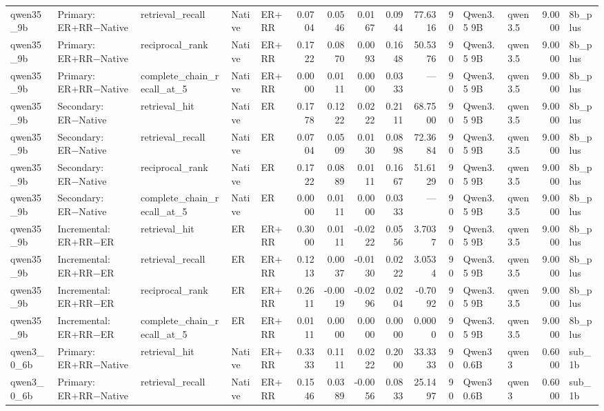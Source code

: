 \begin{tabular}{lllllrrrrrrllrl}
qwen35_9b & Primary: ER+RR−Native & retrieval_recall & Native & ER+RR & 0.0704 & 0.0546 & 0.0167 & 0.0944 & 77.6316 & 90 & Qwen3.5 9B & qwen3.5 & 9.0000 & 8b_plus \\
qwen35_9b & Primary: ER+RR−Native & reciprocal_rank & Native & ER+RR & 0.1722 & 0.0870 & 0.0093 & 0.1648 & 50.5376 & 90 & Qwen3.5 9B & qwen3.5 & 9.0000 & 8b_plus \\
qwen35_9b & Primary: ER+RR−Native & complete_chain_recall_at_5 & Native & ER+RR & 0.0000 & 0.0111 & 0.0000 & 0.0333 & — & 90 & Qwen3.5 9B & qwen3.5 & 9.0000 & 8b_plus \\
qwen35_9b & Secondary: ER−Native & retrieval_hit & Native & ER & 0.1778 & 0.1222 & 0.0222 & 0.2111 & 68.7500 & 90 & Qwen3.5 9B & qwen3.5 & 9.0000 & 8b_plus \\
qwen35_9b & Secondary: ER−Native & retrieval_recall & Native & ER & 0.0704 & 0.0509 & 0.0130 & 0.0898 & 72.3684 & 90 & Qwen3.5 9B & qwen3.5 & 9.0000 & 8b_plus \\
qwen35_9b & Secondary: ER−Native & reciprocal_rank & Native & ER & 0.1722 & 0.0889 & 0.0111 & 0.1667 & 51.6129 & 90 & Qwen3.5 9B & qwen3.5 & 9.0000 & 8b_plus \\
qwen35_9b & Secondary: ER−Native & complete_chain_recall_at_5 & Native & ER & 0.0000 & 0.0111 & 0.0000 & 0.0333 & — & 90 & Qwen3.5 9B & qwen3.5 & 9.0000 & 8b_plus \\
qwen35_9b & Incremental: ER+RR−ER & retrieval_hit & ER & ER+RR & 0.3000 & 0.0111 & -0.0222 & 0.0556 & 3.7037 & 90 & Qwen3.5 9B & qwen3.5 & 9.0000 & 8b_plus \\
qwen35_9b & Incremental: ER+RR−ER & retrieval_recall & ER & ER+RR & 0.1213 & 0.0037 & -0.0130 & 0.0222 & 3.0534 & 90 & Qwen3.5 9B & qwen3.5 & 9.0000 & 8b_plus \\
qwen35_9b & Incremental: ER+RR−ER & reciprocal_rank & ER & ER+RR & 0.2611 & -0.0019 & -0.0296 & 0.0204 & -0.7092 & 90 & Qwen3.5 9B & qwen3.5 & 9.0000 & 8b_plus \\
qwen35_9b & Incremental: ER+RR−ER & complete_chain_recall_at_5 & ER & ER+RR & 0.0111 & 0.0000 & 0.0000 & 0.0000 & 0.0000 & 90 & Qwen3.5 9B & qwen3.5 & 9.0000 & 8b_plus \\
qwen3_0_6b & Primary: ER+RR−Native & retrieval_hit & Native & ER+RR & 0.3333 & 0.1111 & 0.0222 & 0.2000 & 33.3333 & 90 & Qwen3 0.6B & qwen3 & 0.6000 & sub_1b \\
qwen3_0_6b & Primary: ER+RR−Native & retrieval_recall & Native & ER+RR & 0.1546 & 0.0389 & -0.0056 & 0.0833 & 25.1497 & 90 & Qwen3 0.6B & qwen3 & 0.6000 & sub_1b \\

\end{tabular}
